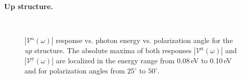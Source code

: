 \documentclass[prb,11pt,tightenlines,twocolumn,aps]{revtex4-1}
\begin{document}
\textbf{Up structure.}
\begin{figure}[t]
    \centering
    \\
    
    \caption{$|\mathcal{V}^{\mathrm{a}}(\omega)|$ response vs. photon energy vs.
    polarization angle for the \emph{up} structure. The absolute maxima of both
    responses $|\mathcal{V}^{\mathrm{x}}(\omega)|$ and
    $|\mathcal{V}^{\mathrm{y}}(\omega)|$ are localized in the energy
    range from 0.08\,eV to 0.10\,eV and for polarization angles from
    $25^{\circ}$ to $50^{\circ}$.}
    \label{fig:up-3d-vva-1}
\end{figure}
\end{document}
